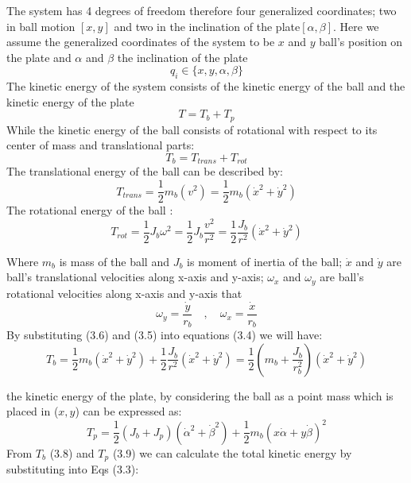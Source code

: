 The system has 4 degrees of freedom therefore four generalized coordinates; two in ball motion \([x,y]\) and two in the inclination of the plate\([\alpha, \beta]\). Here we assume the generalized coordinates of the system to be $x$ and $y$ ball’s position on the plate and $\alpha$ and $\beta$ the inclination of the plate 
\[ q_i \in \{ x,y,\alpha,\beta\}  \]
The kinetic energy of the system consists of the kinetic energy of the ball and the kinetic energy of the plate
\begin{equation} T  = T_b + T_p  \end{equation}
While the kinetic energy of the ball consists of rotational with respect
to its center of mass and translational parts:
\begin{equation}T_b  = T_{trans} + T_{rot}  \end{equation}
 The translational energy of the ball can be described by: 
\begin{equation} T_{trans} = \frac{1}{2}m_b(v^2) = \frac{1}{2}m_b(\dot{x}^2 +\dot{y}^2)   \end{equation}
 The rotational energy of the ball :
\begin{equation}T_{rot} = \frac{1}{2}J_b\omega^2 = \frac{1}{2}J_b\frac{v^2}{r^2} = \frac{1}{2}\frac{J_b}{r^2}(\dot{x}^2 +\dot{y}^2)  \end{equation}
 

Where $m_b$ is mass of the ball and $J_b$ is moment of inertia of the ball; $\dot x$ and $\dot y$ are ball’s translational velocities along x-axis and y-axis; $\omega_x$ and $\omega_y$ are ball’s
rotational velocities along x-axis and y-axis that 
\begin{equation}
\omega_y = \frac{\dot{y}}{r_b} \quad  , \quad  \omega_x = \frac{\dot{x}}{r_b}  
\end{equation}
By substituting  (3.6) and (3.5) into equations
(3.4) we will have:
\begin{equation}
T_b = \frac{1}{2}m_b(\dot{x}^2 +\dot{y}^2) +
\frac{1}{2}\frac{J_b}{r^2}(\dot{x}^2 +\dot{y}^2) =
\frac{1}{2} \left( m_b + \frac{J_b}{r_{b}^2} \right) (\dot{x}^2 +\dot{y}^2)   
\end{equation}

the kinetic energy of the plate, by considering the ball as a point mass which is placed in ($x, y$) can be expressed as: 
\begin{equation}
T_p = \frac{1}{2} (J_b + J_p) \left( \dot{\alpha}^2 +\dot{\beta}^2 \right) + \frac{1}{2} m_b \left( x\dot{\alpha} + y\dot{\beta} \right)^2 
\end{equation}
From $T_b$ (3.8) and $T_p$ (3.9)  we can calculate the total kinetic energy by substituting into Eqs (3.3):


